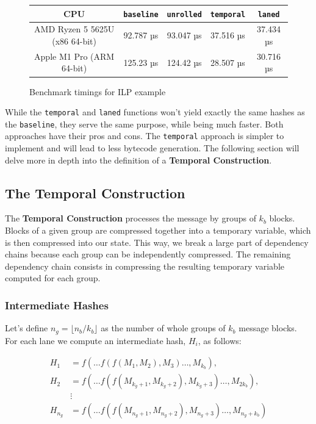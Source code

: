 \documentclass[10pt]{article}
\begin{document}
\begin{figure}[H]
\centering
\begin{tabular}{|c|c|c|c|c|}
\hline
CPU & \texttt{baseline} & \texttt{unrolled} & \texttt{temporal} & \texttt{laned} \\
\hline
AMD Ryzen 5 5625U (x86 64-bit) & 92.787 µs & 93.047 µs & 37.516 µs & 37.434 µs \\
Apple M1 Pro (ARM 64-bit) & 125.23 µs & 124.42 µs & 28.507 µs & 30.716 µs \\
\hline
\end{tabular}
\caption{Benchmark timings for ILP example}
\label{tab:your_table_label}
\end{figure}

While the \texttt{temporal} and \texttt{laned} functions won't yield exactly the same hashes as the \texttt{baseline}, they serve the same purpose, while being much faster.
Both approaches have their pros and cons. The \texttt{temporal} approach is simpler to implement and will lead to less bytecode generation.
The following section will delve more in depth into the definition of a \textbf{Temporal Construction}.

\clearpage
\subsection{The Temporal Construction}

The \textbf{Temporal Construction} processes the message by groups of \( k_b \) blocks. Blocks of a given group are compressed together into a temporary variable, which is then compressed into our state. This way, we break a large part of dependency chains because each group can be independently compressed. The remaining dependency chain consists in compressing the resulting temporary variable computed for each group.

\subsubsection{Intermediate Hashes}

Let's define \( n_g = \lfloor {n_b}/{k_b} \rfloor \) as the number of whole groups of \( k_b \) message blocks. \\
For each lane we compute an intermediate hash, \( H_i \), as follows:

\begin{align*}
H_{1} &= f(\ldots f(f(M_1, M_2), M_3)\ldots, M_{k_b}), \\
H_{2} &= f(\ldots f(f(M_{k_g+1}, M_{k_g+2}), M_{k_g+3})\ldots, M_{2k_b}), \\
&\vdots \\
H_{n_g} &= f(\ldots f(f(M_{n_g+1}, M_{n_g+2}), M_{n_g+3})\ldots, M_{n_g+k_b})
\end{align*}
\end{document}
